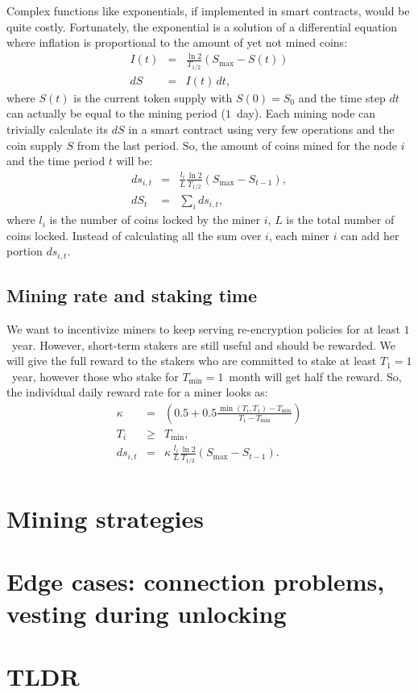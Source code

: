 \documentclass[longbibliography,nofootinbib,twocolumn]{revtex4-1}
\begin{document}
Complex functions like exponentials, if implemented in smart contracts, would be quite costly.
Fortunately, the exponential is a solution of a differential equation where inflation is proportional to the amount of yet not mined coins:
\begin{eqnarray}
    I(t) &=& \frac{\ln{2}}{T_{1/2}} \left( S_{\max} - S(t) \right)\\
    dS &=& I(t)\, dt,
\end{eqnarray}
where $S(t)$ is the current token supply with $S(0)=S_0$ and the time step $dt$ can actually be equal to the mining period ($1$~day).
Each mining node can trivially calculate its $dS$ in a smart contract using very few operations and the coin supply $S$ from the last period.
So, the amount of coins mined for the node $i$ and the time period $t$ will be:
\begin{eqnarray}
    \label{eq:rate-max}
    ds_{i,t} &=& \frac{l_i}{L} \frac{\ln{2}}{T_{1/2}} \left( S_{\max} - S_{t-1} \right),\\
    dS_t &=& \sum_i ds_{i,t},
\end{eqnarray}
where $l_i$ is the number of coins locked by the miner $i$, $L$ is the total number of coins locked.
Instead of calculating all the sum over $i$, each miner $i$ can add her portion $ds_{i,t}$.

\subsection{Mining rate and staking time}

We want to incentivize miners to keep serving re-encryption policies for at least $1$~year.
However, short-term stakers are still useful and should be rewarded.
We will give the full reward to the stakers who are committed to stake at least $T_1=1$~year,
however those who stake for $T_{\min}=1$~month will get half the reward.
So, the individual daily reward rate for a miner looks as:
\begin{eqnarray}
    \kappa &=& \left(0.5 + 0.5\frac{\min(T_i, T_1) - T_{\min}}{T_1 - T_{\min}}\right)\\
    T_i &\ge& T_{\min},\\
    ds_{i,t} &=&  \kappa\, \frac{l_i}{L} \frac{\ln{2}}{T_{1/2}} \left( S_{\max} - S_{t-1}\right).\\
\end{eqnarray}

\section{Mining strategies}

\section{Edge cases: connection problems, vesting during unlocking}

\section{TLDR}


\end{document}
